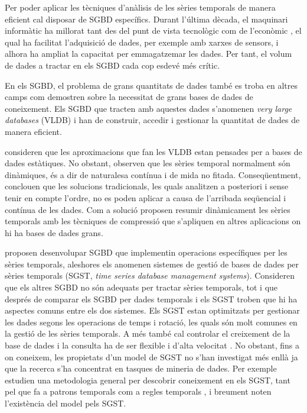 Per poder aplicar les tècniques d'anàlisis de les sèries temporals de manera eficient cal disposar de SGBD específics. 
Durant l'última dècada, el maquinari informàtic ha millorat tant des del punt de vista tecnològic com de l'econòmic \parencite{deligiannakis07}, el qual ha facilitat l'adquisició de dades, per exemple amb xarxes de sensors, i alhora ha ampliat la capacitat per emmagatzemar les dades. 
Per tant, el volum de dades a tractar  en els SGBD cada cop esdevé més crític.

 
En els SGBD, el problema de grans quantitats de dades també es troba en altres camps com demostren \textcite{mylopoulos96} sobre la necessitat de grans bases de dades de coneixement. Els SGBD que tracten amb aquestes dades s'anomenen \emph{very large databases} (VLDB) i han de construir, accedir i gestionar la quantitat de dades de manera eficient.

\textcite{ogras06} consideren que les aproximacions que fan les VLDB
estan pensades per a bases de dades estàtiques. No obstant, observen
que les sèries temporal normalment són dinàmiques, és a dir de
naturalesa contínua i de mida no fitada. Conseqüentment, conclouen que
les solucions tradicionals, les quals analitzen a posteriori i sense
tenir en compte l'ordre, no es poden aplicar a causa de l'arribada
seqüencial i contínua de les dades.  Com a solució proposen resumir
dinàmicament les sèries temporals amb les tècniques de compressió que
s'apliquen en altres aplicacions on hi ha bases de dades grans.




\textcite{dreyer94} proposen desenvolupar SGBD que implementin operacions específiques per les sèries temporals, aleshores els anomenen sistemes de gestió de bases de dades per sèries temporals (SGST, \emph{time series database management systems}). Consideren que els altres SGBD no són adequats per tractar sèries temporals, tot i que després de comparar els SGBD per dades temporals i els SGST \parencite{schmidt95} troben que hi ha aspectes comuns entre els dos sistemes.
Els SGST estan optimitzats per gestionar les dades segons les operacions de temps i rotació, les quals són molt comunes en la gestió de les sèries temporals.  A més també cal controlar el creixement de la base de dades i la consulta ha de ser flexible i d'alta velocitat \parencite{keogh10:isax}. 
No obstant, fins a on coneixem, les propietats d'un model de SGST no s'han investigat més enllà  ja que la recerca s'ha concentrat en tasques de mineria de dades. Per exemple \textcite{last01} estudien una metodologia general per descobrir coneixement en els SGST, tant pel que fa a 
patrons temporals %
com a regles temporals%
, i breument noten l'existència del model \cite{dreyer94} pels SGST.


